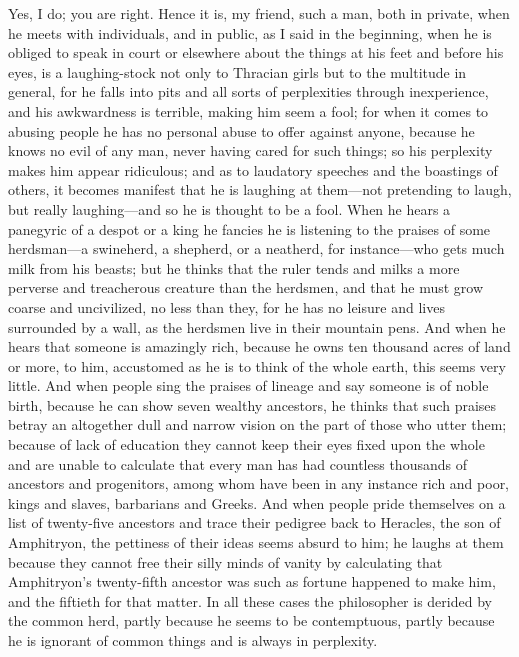 \documentclass[letterpaper,12pt]{article}
\newcommand{\stephpag}[1]{\marginnote{\small\itshape\fontfamily{ppl}\selectfont #1}}
\begin{document}
\begin{drama}
\theodorusspeaks
Yes, I do; you are right.
\socratesspeaks
Hence it is, my friend, such a man, both in private, when he meets with individuals, and in public, as I said in the beginning, \stephpag{c} when he is obliged to speak in court or elsewhere about the things at his feet and before his eyes, is a laughing-stock not only to Thracian girls but to the multitude in general, for he falls into pits and all sorts of perplexities through inexperience, and his awkwardness is terrible, making him seem a fool; for when it comes to abusing people he has no personal abuse to offer against anyone, because he knows no evil of any man, never having cared for such things; so his perplexity makes him appear ridiculous; and as to laudatory speeches \stephpag{d} and the boastings of others, it becomes manifest that he is laughing at them—not pretending to laugh, but really laughing—and so he is thought to be a fool. When he hears a panegyric of a despot or a king he fancies he is listening to the praises of some herdsman—a swineherd, a shepherd, or a neatherd, for instance—who gets much milk from his beasts; but he thinks that the ruler tends and milks a more perverse and treacherous creature than the herdsmen, and that he must grow coarse and uncivilized, \stephpag{e} no less than they, for he has no leisure and lives surrounded by a wall, as the herdsmen live in their mountain pens. And when he hears that someone is amazingly rich, because he owns ten thousand acres of land or more, to him, accustomed as he is to think of the whole earth, this seems very little. And when people sing the praises of lineage and say someone is of noble birth, because he can show seven wealthy ancestors, he thinks that such praises betray an altogether dull and narrow vision on the part of those who utter them; \stephpag{175 a} because of lack of education they cannot keep their eyes fixed upon the whole and are unable to calculate that every man has had countless thousands of ancestors and progenitors, among whom have been in any instance rich and poor, kings and slaves, barbarians and Greeks. And when people pride themselves on a list of twenty-five ancestors and trace their pedigree back to Heracles, the son of Amphitryon, the pettiness of their ideas seems absurd to him; he laughs at them because they cannot free their silly minds of vanity by calculating that \stephpag{b} Amphitryon's twenty-fifth ancestor was such as fortune happened to make him, and the fiftieth for that matter. In all these cases the philosopher is derided by the common herd, partly because he seems to be contemptuous, partly because he is ignorant of common things and is always in perplexity.

\end{drama}
\end{document}
